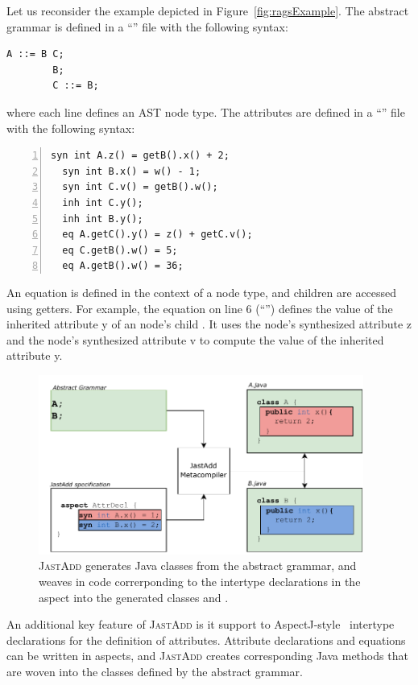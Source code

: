 Let us reconsider the example depicted in Figure~\ref{fig:ragsExample}.
The abstract grammar is defined in a ``'' file with the following syntax:
    \begin{lstlisting}[language=JastAdd]
        A ::= B C;
        B;
        C ::= B;
    \end{lstlisting}
where each line defines an AST node type.
The attributes are defined in a ``'' file with the following syntax:
    \begin{lstlisting}[language=JastAdd, numbers=left,]
  syn int A.z() = getB().x() + 2;
  syn int B.x() = w() - 1;
  syn int C.v() = getB().w();
  inh int C.y();
  inh int B.y();
  eq A.getC().y() = z() + getC.v();
  eq C.getB().w() = 5;
  eq A.getB().w() = 36;
    \end{lstlisting}
An equation is defined in the context of a node type, and children are accessed using getters.
For example, the equation on line 6 (``'') defines the value of the 
inherited attribute \textcolor{ATGsym}{y} of an  node's child . 
It uses the  node's synthesized attribute \textcolor{ATGsym}{z} and the  node's
synthesized attribute \textcolor{ATGsym}{v} to compute the value of the inherited attribute \textcolor{ATGsym}{y}.
\begin{figure}
    \begin{center}
        \includegraphics[width=0.95\textwidth]{kappa/img/Intertype.pdf}
    \end{center}
    \caption{\label{fig:interType} \textsc{JastAdd} generates Java classes from the abstract grammar, and 
    weaves in code correrponding to the intertype declarations in the aspect into the generated classes  and .}
\end{figure}

An additional key feature of \textsc{JastAdd} is it support to AspectJ-style~\cite{Kiczales1997Aspect} intertype 
declarations for the definition of attributes.
Attribute declarations and equations can be written in aspects, and \textsc{JastAdd} 
creates corresponding Java methods that are woven into the classes defined by the abstract grammar.

